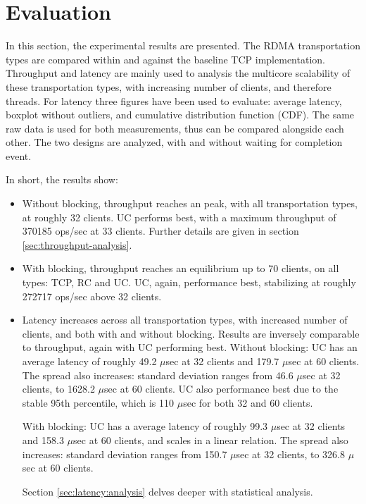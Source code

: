 
\chapter{Evaluation}\label{ch:evaluation} %



\ifpdf
    \graphicspath{{figures/PNG}}
\else
    \graphicspath{{7/figures/EPS/}{7/figures/}}
\fi


% 
In this section, the experimental results are presented.
The RDMA transportation types are compared within and against the baseline TCP implementation.
Throughput and latency are mainly used to analysis the multicore scalability of these transportation types, with increasing number of clients, and therefore threads.
For latency three figures have been used to evaluate: average latency, boxplot without outliers, and cumulative distribution function (CDF).
The same raw data is used for both measurements, thus can be compared alongside each other.
The two designs are analyzed, with and without waiting for completion event.

In short, the results show:
\begin{itemize}
    \item Without blocking, throughput reaches an peak, with all transportation types, at roughly 32 clients.
    UC performs best, with a maximum throughput of 370185 ops/sec at 33 clients.
    Further details are given in section \ref{sec:throughput-analysis}.
    \item With blocking, throughput reaches an equilibrium up to 70 clients, on all types: TCP, RC and UC.
    UC, again, performance best, stabilizing at roughly 272717 ops/sec above 32 clients.
    \item Latency increases across all transportation types, with increased number of clients, and both with and without blocking.
    Results are inversely comparable to throughput, again with UC performing best.
    Without blocking: UC has an average latency of roughly 49.2 $\mu$sec at 32 clients and 179.7 $\mu$sec at 60 clients.
    The spread also increases: standard deviation ranges from 46.6 $\mu$sec at 32 clients, to 1628.2 $\mu$sec at 60 clients.
    UC also performance best due to the stable 95th percentile, which is 110 $\mu$sec for both 32 and 60 clients.

    With blocking: UC has a average latency of roughly 99.3 $\mu$sec at 32 clients and 158.3 $\mu$sec at 60 clients, and scales in a linear relation.
    The spread also increases: standard deviation ranges from 150.7 $\mu$sec at 32 clients, to 326.8 $\mu$sec at 60 clients.

    Section \ref{sec:latency:analysis} delves deeper with statistical analysis.
\end{itemize}

